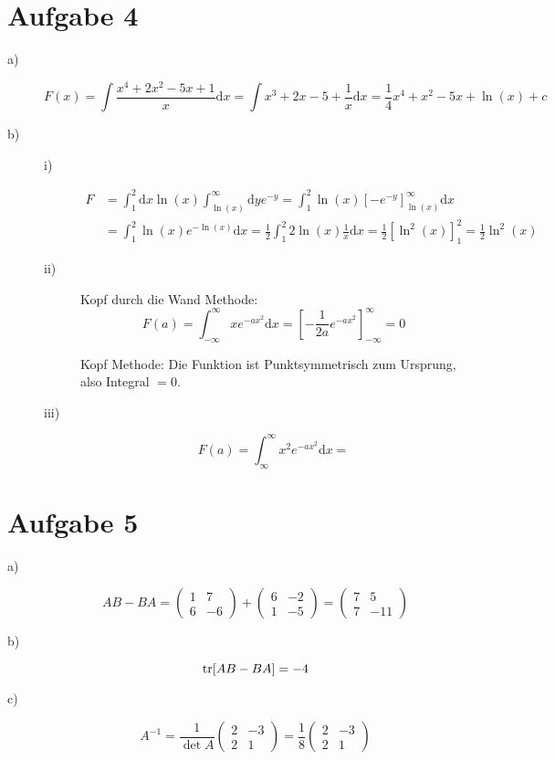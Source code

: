 \section*{Aufgabe 4}
\begin{description}
	\item[a)] 
	\[
		F(x) = \int \frac{x^4 + 2x^2 - 5x + 1}{x} \mathrm{d}x
		= \int x^3 + 2x - 5 + \frac{1}{x} \mathrm{d}x
		= \frac{1}{4} x^4 + x^2 - 5x + \ln(x) + c	
	\]
	\item[b)]
	\begin{description}
		\item[i)] 
		\begin{align*}
			F 
			&= \int^2_1 \mathrm{d} x \ln(x) \int^\infty_{\ln(x)} \mathrm{d} y e^{-y}
			= \int^2_1 \ln(x) \left[ - e^{-y} \right]^\infty_{\ln(x)} \mathrm{d} x \\
			&= \int^2_1 \ln(x) e^{-\ln(x)} \mathrm{d} x
			= \frac{1}{2} \int^2_1 2 \ln(x) \frac{1}{x} \mathrm{d} x
			= \frac{1}{2} \left[ \ln^2(x) \right]^2_1
			= \frac{1}{2} \ln^2(x)
		\end{align*}
		
		\item[ii)] Kopf durch die Wand Methode:
		\[
			F(a) = \int^\infty_{-\infty} x e^{-ax^2} \mathrm{d} x 
			= \left[ -\frac{1}{2a} e^{-ax^2} \right]^\infty_{-\infty}
			= 0
		\]
		
		Kopf Methode: Die Funktion ist Punktsymmetrisch zum Ursprung, also Integral $=0$.
		
		\item[iii)] 
		\[
			F(a) = \int^\infty_{\infty} x^2 e^{-ax^2} \mathrm{d} x 
			= 
		\]
	\end{description}
\end{description}

\section*{Aufgabe 5}
\begin{description}
	\item[a)]
	\[
		AB - BA
		= \begin{pmatrix}
			1 & 7 \\ 6 & -6
		\end{pmatrix} + 
		\begin{pmatrix}
			6 & -2 \\ 1 & -5
		\end{pmatrix}
		= \begin{pmatrix}
			7 & 5 \\ 7 & -11
		\end{pmatrix}
	\] 
	
	\item[b)]
	\[
		\operatorname{tr}[AB - BA] = -4
	\]
	
	\item[c)]
	\[
		A^{-1} = \frac{1}{\det A} \begin{pmatrix}
			2 & -3 \\
			2 & 1
		\end{pmatrix}
		= \frac{1}{8} \begin{pmatrix}
			2 & -3 \\ 2 & 1
		\end{pmatrix}
	\]
\end{description}
